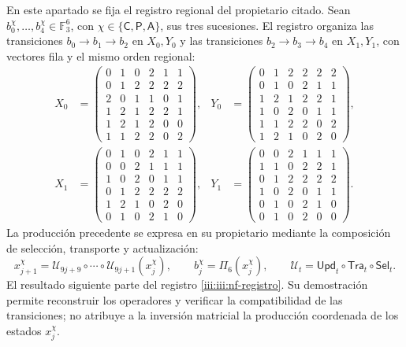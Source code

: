 En este apartado se fija el registro regional del propietario citado.
Sean $b_0^\chi,\ldots,b_4^\chi\in\mathbb F_3^6$, con
$\chi\in\{\mathsf C,\mathsf P,\mathsf A\}$, sus tres sucesiones.
El registro organiza las transiciones $b_0\to b_1\to b_2$ en
$X_0,Y_0$ y las transiciones $b_2\to b_3\to b_4$ en $X_1,Y_1$,
con vectores fila y el mismo orden regional:
\begingroup\small
\begin{equation}
\begin{aligned}
X_0&=\begin{pmatrix}
0&1&0&2&1&1\\0&1&2&2&2&2\\2&0&1&1&0&1\\
1&2&1&2&2&1\\1&2&1&2&0&0\\1&1&2&2&0&2
\end{pmatrix},&
Y_0&=\begin{pmatrix}
0&1&2&2&2&2\\0&1&0&2&1&1\\1&2&1&2&2&1\\
1&0&2&0&1&1\\1&1&2&2&0&2\\1&2&1&0&2&0
\end{pmatrix},\\[1ex]
X_1&=\begin{pmatrix}
0&1&0&2&1&1\\0&0&2&1&1&1\\1&0&2&0&1&1\\
0&1&2&2&2&2\\1&2&1&0&2&0\\0&1&0&2&1&0
\end{pmatrix},&
Y_1&=\begin{pmatrix}
0&0&2&1&1&1\\1&1&0&2&2&1\\0&1&2&2&2&2\\
1&0&2&0&1&1\\0&1&0&2&1&0\\0&1&0&2&0&0
\end{pmatrix}.
\end{aligned}
\label{iii:iii:nf-registro}
\end{equation}
\endgroup
La producción precedente se expresa en su propietario mediante la
composición de selección, transporte y actualización:
\[
 x_{j+1}^{\chi}
 =\mathcal U_{9j+9}\circ\cdots\circ\mathcal U_{9j+1}(x_j^{\chi}),
 \qquad b_j^\chi=\Pi_6(x_j^\chi),
 \qquad\mathcal U_t=\mathsf{Upd}_t\circ\mathsf{Tra}_t\circ\mathsf{Sel}_t.
\]
El resultado siguiente parte del registro \eqref{iii:iii:nf-registro}.
Su demostración permite reconstruir los operadores y verificar la
compatibilidad de las transiciones; no atribuye a la inversión matricial
la producción coordenada de los estados $x_j^\chi$.


